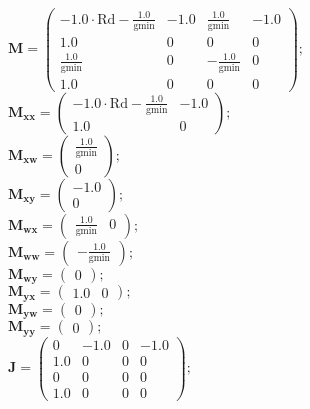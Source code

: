 \documentclass[11pt, oneside]{article}      %
\begin{document}
%
$ \mathbf{M} = \left(\begin{array}{cccc}- 1.0 \cdot \mathrm{Rd} - \frac{1.0}{\mathrm{gmin}} & -1.0 & \frac{1.0}{\mathrm{gmin}} & -1.0\\1.0 & 0 & 0 & 0\\\frac{1.0}{\mathrm{gmin}} & 0 & - \frac{1.0}{\mathrm{gmin}} & 0\\1.0 & 0 & 0 & 0\end{array}\right) ; $ 
%
\\
%
$ \mathbf{M_{xx}} = \left(\begin{array}{cc}- 1.0 \cdot \mathrm{Rd} - \frac{1.0}{\mathrm{gmin}} & -1.0\\1.0 & 0\end{array}\right) ; $ 
%
\\
%
$ \mathbf{M_{xw}} = \left(\begin{array}{c}\frac{1.0}{\mathrm{gmin}}\\0\end{array}\right) ; $ 
%
\\
%
$ \mathbf{M_{xy}} = \left(\begin{array}{c}-1.0\\0\end{array}\right) ; $ 
%
\\
%
$ \mathbf{M_{wx}} = \left(\begin{array}{cc}\frac{1.0}{\mathrm{gmin}} & 0\end{array}\right) ; $ 
%
\\
%
$ \mathbf{M_{ww}} = \left(\begin{array}{c}- \frac{1.0}{\mathrm{gmin}}\end{array}\right) ; $ 
%
\\
%
$ \mathbf{M_{wy}} = \left(\begin{array}{c}0\end{array}\right) ; $ 
%
\\
%
$ \mathbf{M_{yx}} = \left(\begin{array}{cc}1.0 & 0\end{array}\right) ; $ 
%
\\
%
$ \mathbf{M_{yw}} = \left(\begin{array}{c}0\end{array}\right) ; $ 
%
\\
%
$ \mathbf{M_{yy}} = \left(\begin{array}{c}0\end{array}\right) ; $ 
%
\\
%
$ \mathbf{J} = \left(\begin{array}{cccc}0 & -1.0 & 0 & -1.0\\1.0 & 0 & 0 & 0\\0 & 0 & 0 & 0\\1.0 & 0 & 0 & 0\end{array}\right) ; $ 
\end{document}
